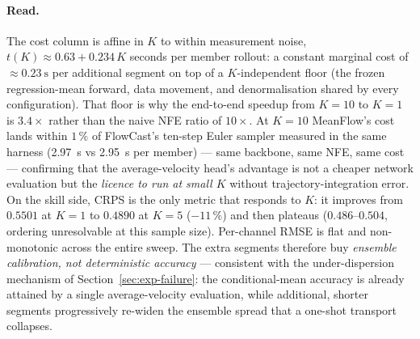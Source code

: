\paragraph{Read.} The cost column is affine in $K$ to within measurement noise, $t(K) \approx 0.63 + 0.234\,K$ seconds per member rollout: a constant marginal cost of $\approx \SI{0.23}{\second}$ per additional segment on top of a $K$-independent floor (the frozen regression-mean forward, data movement, and denormalisation shared by every configuration). That floor is why the end-to-end speedup from $K = 10$ to $K = 1$ is $3.4\times$ rather than the naive NFE ratio of $10\times$. At $K = 10$ MeanFlow's cost lands within $1\,\%$ of FlowCast's ten-step Euler sampler measured in the same harness (\SI{2.97}{\second} vs \SI{2.95}{\second} per member) --- same backbone, same NFE, same cost --- confirming that the average-velocity head's advantage is not a cheaper network evaluation but the \emph{licence to run at small $K$} without trajectory-integration error. On the skill side, CRPS is the only metric that responds to $K$: it improves from $0.5501$ at $K = 1$ to $0.4890$ at $K = 5$ ($-11\,\%$) and then plateaus ($0.486$--$0.504$, ordering unresolvable at this sample size). Per-channel RMSE is flat and non-monotonic across the entire sweep. The extra segments therefore buy \emph{ensemble calibration, not deterministic accuracy} --- consistent with the under-dispersion mechanism of Section~\ref{sec:exp-failure}: the conditional-mean accuracy is already attained by a single average-velocity evaluation, while additional, shorter segments progressively re-widen the ensemble spread that a one-shot transport collapses.

